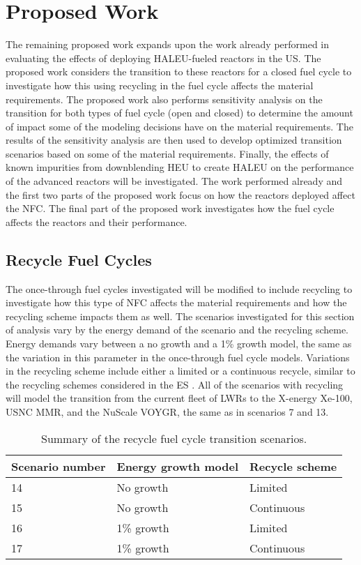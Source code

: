 \section{Proposed Work}
The remaining proposed work expands upon the work already performed in 
evaluating the effects of deploying \gls{HALEU}-fueled reactors in the US. 
The proposed work considers the transition to these reactors for a 
closed fuel cycle to investigate how this using recycling in the fuel 
cycle affects the material requirements. The proposed work also performs 
sensitivity analysis on the transition for both types of fuel cycle 
(open and closed) to determine the amount of impact some of the modeling 
decisions have on the material requirements. The results of the sensitivity 
analysis are then used to develop optimized transition scenarios based on 
some of the material requirements. Finally, the effects of known impurities 
from downblending \gls{HEU} to create \gls{HALEU} on the performance of 
the advanced reactors will be investigated. 
The work performed already and the first two 
parts of the proposed work focus on how the reactors deployed affect 
the \gls{NFC}. The final part of the proposed work investigates how the 
fuel cycle affects the reactors and their performance. 

\subsection{Recycle Fuel Cycles}
The once-through fuel cycles investigated will be modified to include recycling 
to investigate how this type of \gls{NFC} affects the material requirements 
and how the recycling scheme impacts them as well. 
The scenarios investigated for this section of analysis vary by the 
energy demand of the scenario and the recycling scheme. Energy demands vary 
between a no growth and a 1\% growth model, the same as the variation in this 
parameter in the once-through fuel cycle models. Variations in the recycling 
scheme include either a limited or a continuous recycle, similar to the 
recycling schemes considered in the \gls{ES} \cite{wigeland_nuclear_2014}. 
All of the scenarios 
with recycling will model the transition from the current fleet of \glspl{LWR} 
to the X-energy Xe-100, \gls{USNC} \gls{MMR}, and the NuScale VOYGR, the same 
as in scenarios 7 and 13. 

\begin{table}[ht]
    \centering
    \caption{Summary of the recycle fuel cycle transition scenarios.}
    \label{tab:scenarios_recycle}
    \begin{tabular}{l l l}
            \hline
            Scenario number & Energy growth model & Recycle scheme\\\hline
            14 & No growth & Limited \\
            15 & No growth & Continuous \\
            16 & 1\% growth & Limited \\
            17 & 1\% growth & Continuous \\
            \hline
    \end{tabular}
\end{table}

